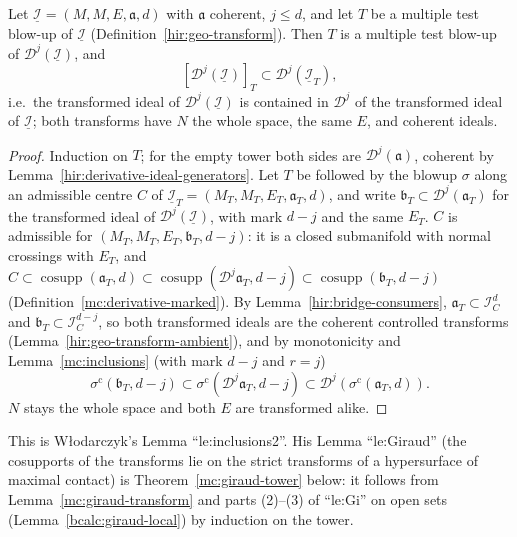 \begin{lemma}
\label{mc:inclusions-tower}
\leanok
Let \(\underline{\mathcal I}=(M,M,E,\mathfrak a,d)\) with \(\mathfrak a\) coherent, \(j\le d\), and let \(T\) be a multiple test blow-up of \(\underline{\mathcal I}\)
(Definition~\ref{hir:geo-transform}). Then \(T\) is a multiple test blow-up of \(\mathcal D^j(\underline{\mathcal I})\), and
\[
 [\mathcal D^j(\underline{\mathcal I})]_T\subset\mathcal D^j(\underline{\mathcal I}_T),
\]
i.e.\ the transformed ideal of \(\mathcal D^j(\underline{\mathcal I})\) is contained in \(\mathcal D^j\) of the transformed ideal of \(\underline{\mathcal I}\); both transforms
have \(N\) the whole space, the same \(E\), and coherent ideals.
\end{lemma}
\begin{proof}
\leanok
Induction on \(T\); for the empty tower both sides are \(\mathcal D^j(\mathfrak a)\), coherent by Lemma~\ref{hir:derivative-ideal-generators}. Let \(T\) be followed by
the blowup \(\sigma\) along an admissible centre \(C\) of \(\underline{\mathcal I}_T=(M_T,M_T,E_T,\mathfrak a_T,d)\), and write
\(\mathfrak b_T\subset\mathcal D^j(\mathfrak a_T)\) for the transformed ideal of \(\mathcal D^j(\underline{\mathcal I})\), with mark \(d-j\) and the same \(E_T\).
\(C\) is admissible for \((M_T,M_T,E_T,\mathfrak b_T,d-j)\): it is a closed submanifold with normal crossings with \(E_T\), and
\(C\subset\operatorname{cosupp}(\mathfrak a_T,d)\subset\operatorname{cosupp}(\mathcal D^j\mathfrak a_T,d-j)\subset\operatorname{cosupp}(\mathfrak b_T,d-j)\)
(Definition~\ref{mc:derivative-marked}). By Lemma~\ref{hir:bridge-consumers}, \(\mathfrak a_T\subset\mathcal I_C^{d}\) and \(\mathfrak b_T\subset\mathcal I_C^{d-j}\), so both
transformed ideals are the coherent controlled transforms (Lemma~\ref{hir:geo-transform-ambient}), and by monotonicity and
Lemma~\ref{mc:inclusions} (with mark \(d-j\) and \(r=j\))
\[
 \sigma^{\mathrm c}(\mathfrak b_T,d-j)\subset\sigma^{\mathrm c}(\mathcal D^j\mathfrak a_T,d-j)\subset\mathcal D^j(\sigma^{\mathrm c}(\mathfrak a_T,d)).
\]
\(N\) stays the whole space and both \(E\) are transformed alike.
\end{proof}
This is Włodarczyk's Lemma ``le:inclusions2''. His Lemma ``le:Giraud'' (the cosupports of the transforms lie on the strict transforms of a
hypersurface of maximal contact) is Theorem~\ref{mc:giraud-tower} below: it follows from Lemma~\ref{mc:giraud-transform} and parts (2)--(3) of
``le:Gi'' on open sets (Lemma~\ref{bcalc:giraud-local}) by induction on the tower.


